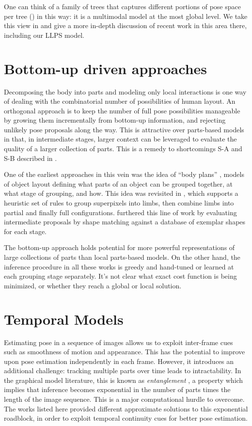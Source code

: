 One can think of a family of trees that captures different portions of pose 
space per tree () in this way: it is a multimodal model at the 
most global level.  We take this view in  and give a more 
in-depth discussion of recent work in this area there, including our LLPS 
model.


\section{Bottom-up driven approaches}
Decomposing the body into parts and modeling only local interactions is one way 
of dealing with the combinatorial number of possibilities of human layout. An 
orthogonal approach is to keep the number of full pose possibilities manageable 
by growing them incrementally from bottom-up information, and rejecting 
unlikely pose proposals along the way.  This is attractive over parts-based 
models in that, in intermediate stages, larger context can be leveraged to 
evaluate the quality of a larger collection of parts. This is a remedy to 
shortcomings S-A and S-B described in .

One of the earliest approaches in this vein was the idea of ``body plans'' 
\citep{bodyplans}, models of object layout defining what parts of an object can 
be grouped together, at what stage of grouping, and how.  This idea was 
revisited in \citep{mori04}, which supports a heuristic set of rules to group 
superpixels into limbs, then combine limbs into partial and finally full 
configurations.  \citet{praveen07} furthered this line of work by evaluating 
intermediate proposals by shape matching against a database of exemplar shapes 
for each stage.

The bottom-up approach holds potential for more powerful representations of 
large collections of parts than local parts-based models.  On the other hand, 
the inference procedure in all these works is greedy and hand-tuned or learned 
at each grouping stage separately.  It's not clear what exact cost function is 
being minimized, or whether they reach a global or local solution.


\section{Temporal Models}\label{sec:rel-video}

Estimating pose in a sequence of images allows us to exploit inter-frame cues 
such as smoothness of motion and appearance.  This has the potential to improve 
upon pose estimation independently in each frame.  However, it introduces an
additional challenge: tracking multiple parts over time leads to 
intractability.  In the graphical model literature, this is known as {\em 
entanglement } \citep{koller-book}, a property which implies that inference 
becomes exponential in the number of parts times the length of the image 
sequence.  This is a major computational hurdle to overcome.  The works listed 
here provided different approximate solutions to this exponential roadblock, in 
order to exploit temporal continuity cues for better pose estimation.

